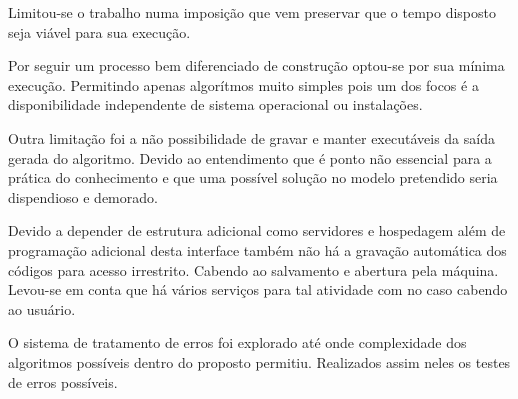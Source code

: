 \ifdraft{\color{green}}{}Limitou-se o trabalho numa imposição que vem preservar que o tempo disposto seja viável para sua execução.

Por seguir um processo bem diferenciado de construção optou-se por sua mínima execução. Permitindo apenas algorítmos muito simples pois um dos focos é a disponibilidade independente de sistema operacional ou instalações.

Outra limitação foi a não possibilidade de gravar e manter executáveis da saída gerada do algoritmo. Devido ao entendimento que é ponto não essencial para a prática do conhecimento e que uma possível solução no modelo pretendido seria dispendioso e demorado.

Devido a depender de estrutura adicional como servidores e hospedagem além de programação adicional desta interface também não há a gravação automática dos códigos para acesso irrestrito. Cabendo ao salvamento e abertura pela máquina. Levou-se em conta que há vários serviços para tal atividade com no caso cabendo ao usuário.

O sistema de tratamento de erros foi explorado até onde complexidade dos algoritmos possíveis dentro do proposto permitiu. Realizados assim neles os testes de erros possíveis.\color{black}
